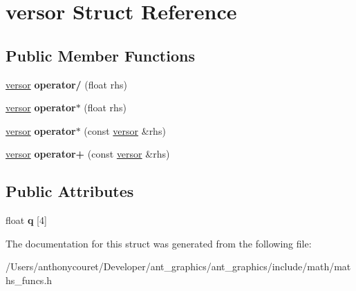 \hypertarget{structversor}{\section{versor Struct Reference}
\label{structversor}
}
\subsection*{Public Member Functions}
\begin{DoxyCompactItemize}
\item 
\hypertarget{structversor_a42bf73265a1411e514bfe7d4d440a151}{\hyperlink{structversor}{versor} {\bfseries operator/} (float rhs)}\label{structversor_a42bf73265a1411e514bfe7d4d440a151}

\item 
\hypertarget{structversor_afd1dbdd4f20912ea116bb8917f18bcad}{\hyperlink{structversor}{versor} {\bfseries operator$\ast$} (float rhs)}\label{structversor_afd1dbdd4f20912ea116bb8917f18bcad}

\item 
\hypertarget{structversor_a86ac9a5e478f52bec5e155ab5b4d73a2}{\hyperlink{structversor}{versor} {\bfseries operator$\ast$} (const \hyperlink{structversor}{versor} \&rhs)}\label{structversor_a86ac9a5e478f52bec5e155ab5b4d73a2}

\item 
\hypertarget{structversor_af9555b1a9f091ae59125fd04894f0979}{\hyperlink{structversor}{versor} {\bfseries operator+} (const \hyperlink{structversor}{versor} \&rhs)}\label{structversor_af9555b1a9f091ae59125fd04894f0979}

\end{DoxyCompactItemize}
\subsection*{Public Attributes}
\begin{DoxyCompactItemize}
\item 
\hypertarget{structversor_adc671ad0000c2b8b2bdd332ce2070284}{float {\bfseries q} \mbox{[}4\mbox{]}}\label{structversor_adc671ad0000c2b8b2bdd332ce2070284}

\end{DoxyCompactItemize}


The documentation for this struct was generated from the following file\+:\begin{DoxyCompactItemize}
\item 
/\+Users/anthonycouret/\+Developer/ant\+\_\+graphics/ant\+\_\+graphics/include/math/maths\+\_\+funcs.\+h\end{DoxyCompactItemize}
